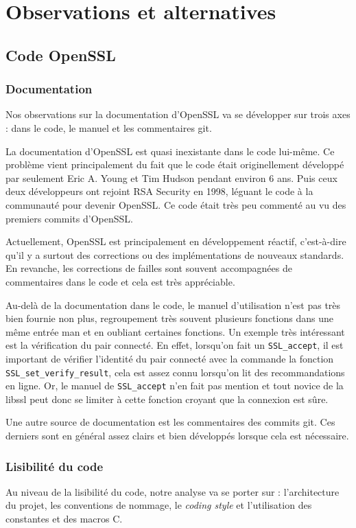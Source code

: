 \chapter{Observations et alternatives}
\section{Code OpenSSL}

\subsection{Documentation}
Nos observations sur la documentation d'OpenSSL va se développer sur trois axes : dans le code, le manuel et les commentaires git.

La documentation d'OpenSSL est quasi inexistante dans le code lui-même. 
Ce problème vient principalement du fait que le code était originellement développé par seulement Eric A. Young et Tim Hudson pendant environ 6 ans. Puis ceux deux développeurs ont rejoint RSA Security en 1998, léguant le code à la communauté pour devenir OpenSSL. Ce code était très peu commenté au vu des premiers commits d'OpenSSL. 

Actuellement, OpenSSL est principalement en développement réactif, c'est-à-dire qu'il y a surtout des corrections ou des implémentations de nouveaux standards. En revanche, les corrections de failles sont souvent accompagnées de commentaires dans le code et cela est très appréciable.

Au-delà de la documentation dans le code, le manuel d'utilisation n'est pas très bien fournie non plus, regroupement très souvent plusieurs fonctions dans une même entrée man et en oubliant certaines fonctions. Un exemple très intéressant est la vérification du pair connecté. En effet, lorsqu'on fait un \verb+SSL_accept+, il est important de vérifier l'identité du pair connecté avec la commande la fonction \verb+SSL_set_verify_result+, cela est assez connu lorsqu'on lit des recommandations en ligne. Or, le manuel de \verb+SSL_accept+ n'en fait pas mention et tout novice de la libssl peut donc se limiter à cette fonction croyant que la connexion est sûre.

Une autre source de documentation est les commentaires des commits git. Ces derniers sont en général assez clairs et bien développés lorsque cela est nécessaire.

\subsection{Lisibilité du code}
Au niveau de la lisibilité du code, notre analyse va se porter sur : l'architecture du projet, les conventions de nommage, le \textit{coding style} et l'utilisation des constantes et des macros C.

